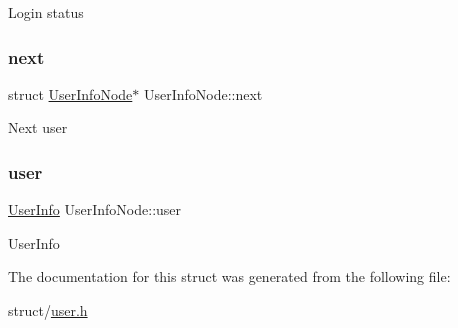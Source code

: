 Login status \mbox{\label{structUserInfoNode_a1ec8cd5d9a96c37b18f171ffbdb25fe0}} 
\subsubsection{\texorpdfstring{next}{next}}
{\footnotesize\ttfamily struct \hyperlink{structUserInfoNode}{User\+Info\+Node}$\ast$ User\+Info\+Node\+::next}

Next user \mbox{\label{structUserInfoNode_a6a59492f775ec3e2907ad836a851cff4}} 
\subsubsection{\texorpdfstring{user}{user}}
{\footnotesize\ttfamily \hyperlink{user_8h_a50f85a8d84a82c18fb78a8aebba46bef}{User\+Info} User\+Info\+Node\+::user}

User\+Info 

The documentation for this struct was generated from the following file\+:\begin{DoxyCompactItemize}
\item 
struct/\hyperlink{user_8h}{user.\+h}\end{DoxyCompactItemize}
